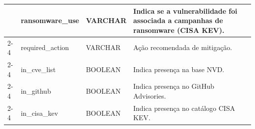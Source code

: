 \begin{table}[H]
{\begin{tabular}{|p{2.2cm}|p{3.3cm}|p{1.9cm}|p{8.4cm}|}
                              & ransomware\_use        & VARCHAR       & Indica se a vulnerabilidade foi associada a campanhas de ransomware (CISA KEV).                       \\ \cline{2-4}
                              & required\_action       & VARCHAR       & Ação recomendada de mitigação.                                                                        \\ \cline{2-4}
                              & in\_cve\_list          & BOOLEAN       & Indica presença na base NVD.                                                                          \\ \cline{2-4}
                              & in\_github             & BOOLEAN       & Indica presença no GitHub Advisories.                                                                 \\ \cline{2-4}
                              & in\_cisa\_kev          & BOOLEAN       & Indica presença no catálogo CISA KEV.                                                                 \\ \hline


\end{tabular}}
\end{table}
